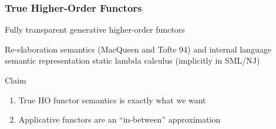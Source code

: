 \documentclass{beamer}
\begin{document}
\begin{frame}[fragile]
\frametitle{True Higher-Order Functors}
\begin{description}
	\itemsep=1cm
\item[Alternative:] Fully transparent generative higher-order functors
\item[Examples:] Re-elaboration semantics (MacQueen and Tofte 94) and internal language semantic representation static lambda calculus (implicitly in SML/NJ) %
\end{description}
\begin{block}{Claim}
\begin{enumerate}
	\itemsep=0.7cm
	\item True HO functor semantics is exactly what we want
	\item Applicative functors are an ``in-between'' approximation
\end{enumerate} 
\end{block}
\end{frame}


\end{document}
